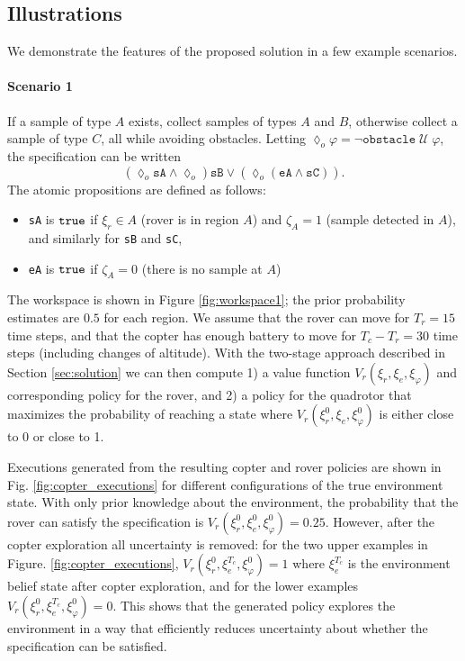 \documentclass[draft,conference]{IEEEtran}
\begin{document}
\subsection{Illustrations}

We demonstrate the features of the proposed solution in a few example scenarios.

\paragraph{Scenario 1} If a sample of type $A$ exists, collect samples of types $A$ and $B$, otherwise collect a sample of type $C$, all while avoiding obstacles. Letting $\lozenge_o \varphi = \lnot \texttt{obstacle} \; \mathcal U \; \varphi$, the specification can be written
\begin{equation*}
  \left( \lozenge_o \texttt{sA} \land \lozenge_o \right) \texttt{sB} \lor \left( \lozenge_o ( \texttt{eA} \land \texttt{sC} ) \right).
\end{equation*}
The atomic propositions are defined as follows:
\begin{itemize}
	\item \texttt{sA} is $\texttt{true}$ if $\xi_r \in A$ (rover is in region $A$) and $\zeta_A = 1$ (sample detected in $A$), and similarly for \texttt{sB} and \texttt{sC},
	\item \texttt{eA} is $\texttt{true}$ if $\zeta_A = 0$ (there is no sample at $A$)
\end{itemize}
The workspace is shown in Figure \ref{fig:workspace1}; the prior probability estimates are $0.5$ for each region. We assume that the rover can move for $T_r = 15$ time steps, and that the copter has enough battery to move for $T_c - T_r = 30$ time steps (including changes of altitude). With the two-stage approach described in Section \ref{sec:solution} we can then compute 1) a value function $V_r(\xi_r, \xi_e, \xi_\varphi)$ and corresponding policy for the rover, and 2) a policy for the quadrotor that maximizes the probability of reaching a state where $V_r(\xi_r^0, \xi_e, \xi_\varphi^0)$ is either close to 0 or close to 1.

Executions generated from the resulting copter and rover policies are shown in Fig. \ref{fig:copter_executions} for different configurations of the true environment state. With only prior knowledge about the environment, the probability that the rover can satisfy the specification is $V_r(\xi_r^0, \xi_e^0, \xi_\varphi^0) = 0.25$. However, after the copter exploration all uncertainty is removed: for the two upper examples in Figure. \ref{fig:copter_executions}, $V_r(\xi_r^0, \xi_e^{T_{c}}, \xi_\varphi^0) = 1$ where $\xi_e^{T_c}$ is the environment belief state after copter exploration, and for the lower examples $V_r(\xi_r^0, \xi_e^{T_{c}}, \xi_\varphi^0) = 0$. This shows that the generated policy explores the environment in a way that efficiently reduces uncertainty about whether the specification can be satisfied.
\end{document}
